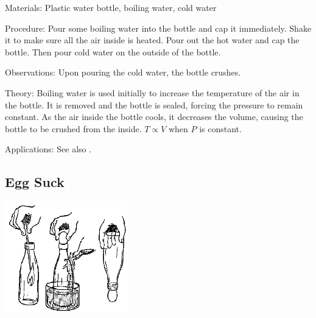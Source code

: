 \begin{multicols}{2}
\begin{description*}
\item[Materials:]{Plastic water bottle, boiling water, cold water}
\item[Procedure:]{Pour some boiling water into the bottle and cap it immediately. Shake it to make sure all the air inside is heated. Pour out the hot water and cap the bottle. Then pour cold water on the outside of the bottle.}
\item[Observations:]{Upon pouring the cold water, the bottle crushes.}
\item[Theory:]{Boiling water is used initially to increase the temperature of the air in the bottle. It is removed and the bottle is sealed, forcing the pressure to remain constant. As the air inside the bottle cools, it decreases the volume, causing the bottle to be crushed from the inside. $T \propto V$ when $P$ is constant.}
\item[Applications:]{See also .}
\end{description*}

\subsection{Egg Suck}

\begin{center}
\includegraphics[width=0.4\textwidth]{./img/source/egg-suck.png}
\end{center}


\end{multicols}
